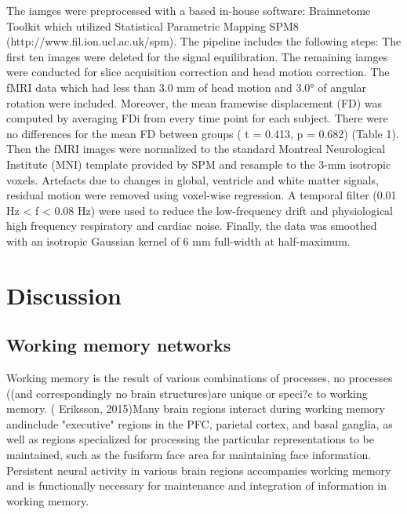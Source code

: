 \documentclass[preprint,authoryear,review,12pt]{elsarticle}
\begin{document}
The iamges were preprocessed with a based in-house software: Brainnetome Toolkit which utilized Statistical Parametric Mapping SPM8 (http://www.fil.ion.ucl.ac.uk/spm). The pipeline includes the following steps: The first ten images were deleted for the signal equilibration. The remaining iamges were conducted for slice acquisition correction and head motion correction.  The fMRI data which had
less than 3.0 mm of head motion and 3.0° of angular rotation were included.  Moreover, the mean framewise displacement (FD) was computed by averaging FDi from every time point for each subject. There were no differences for the mean FD between groups
( t = 0.413, p = 0.682) (Table 1). Then the fMRI images were normalized to the standard Montreal Neurological Institute (MNI) template provided by SPM and resample to the 3-mm isotropic voxels. Artefacts due to changes in global, ventricle and white matter signals, residual motion were removed using voxel-wise regression. A temporal filter (0.01 Hz < f < 0.08 Hz) were used to reduce the low-frequency drift and physiological high frequency respiratory and cardiac noise.  Finally, the data was smoothed with an isotropic Gaussian kernel of 6 mm full-width at half-maximum. 

\section*{Discussion} 

\subsection*{Working memory networks}

Working memory is the result of various combinations of processes, no processes ((and correspondingly no brain structures)are unique or speci?c to working memory. ( Eriksson, 2015)Many brain regions interact during working memory andinclude "executive" regions in the PFC, parietal cortex, and basal ganglia, as well as regions specialized for processing the particular representations to be maintained, such as the fusiform face area for maintaining face information. Persistent neural activity in various brain regions accompanies working memory and is functionally necessary for maintenance and integration of information in working memory.
\end{document}
